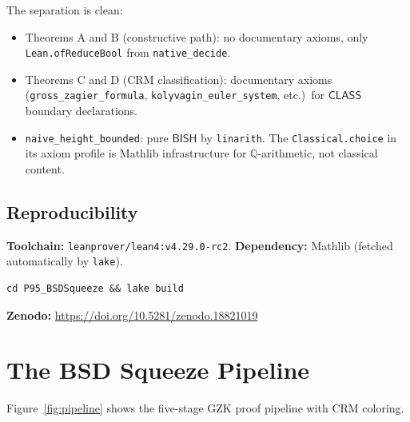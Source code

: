 \documentclass[11pt]{article}
\theoremstyle{plain}
\theoremstyle{definition}
\theoremstyle{remark}
\newcommand{\Q}{\mathbb{Q}}
\newcommand{\BISH}{\ensuremath{\mathsf{BISH}}}
\newcommand{\CLASS}{\ensuremath{\mathsf{CLASS}}}
\begin{document}
\noindent The separation is clean:
\begin{itemize}[nosep]
\item Theorems A and B (constructive path): no documentary axioms, only \texttt{Lean.ofReduceBool} from \texttt{native\_decide}.
\item Theorems C and D (CRM classification): documentary axioms (\texttt{gross\_zagier\_formula}, \texttt{kolyvagin\_euler\_system}, etc.)\ for $\CLASS$ boundary declarations.
\item \texttt{naive\_height\_bounded}: pure $\BISH$ by \texttt{linarith}. The \texttt{Classical.choice} in its axiom profile is Mathlib infrastructure for $\Q$-arithmetic, not classical content.
\end{itemize}

\subsection{Reproducibility}

\textbf{Toolchain:} \texttt{leanprover/lean4:v4.29.0-rc2}.
\textbf{Dependency:} Mathlib (fetched automatically by \texttt{lake}).

\begin{verbatim}
cd P95_BSDSqueeze && lake build
\end{verbatim}

\noindent
\textbf{Zenodo:} \url{https://doi.org/10.5281/zenodo.18821019}

\section{The BSD Squeeze Pipeline}
\label{sec:pipeline}

Figure~\ref{fig:pipeline} shows the five-stage GZK proof pipeline with CRM coloring.
\end{document}
